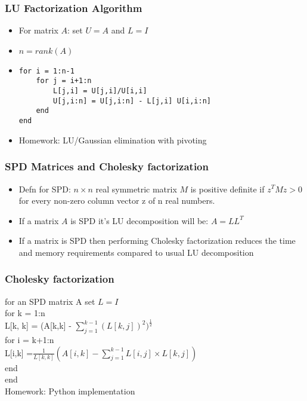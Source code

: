 \documentclass{beamer}
\begin{document}
\begin{frame}[fragile]
\frametitle{LU Factorization Algorithm}

\begin{itemize}
\item For matrix $A$: set $U = A$ and $L = I$
\item $n = rank(A)$
\item 
\begin{lstlisting}
for i = 1:n-1
	for j = i+1:n
  		L[j,i] = U[j,i]/U[i,i] 
  		U[j,i:n] = U[j,i:n] - L[j,i] U[i,i:n]
  	end
end
\end{lstlisting}
\item Homework: LU/Gaussian elimination with pivoting
\end{itemize}

\end{frame}

\begin{frame}
\frametitle{SPD Matrices and Cholesky factorization}

\begin{itemize}
\item Defn for SPD: $n \times n$ real symmetric matrix $M$ is positive definite if $z^TMz > 0$ for every non-zero column vector z of n real numbers.
\item If a matrix $A$ is SPD it's LU decomposition will be: $A = LL^T$
\item If a matrix is SPD then performing Cholesky factorization reduces the time and memory requirements compared to usual LU decomposition
\end{itemize}

\end{frame}


\begin{frame}
\frametitle{ Cholesky factorization}
for an SPD matrix A set $L = I$\\

for k = 1:n\\
\quad L[k, k] = (A[k,k] - $\sum_{j = 1}^{k-1}(L[k,j])^2)^{\frac{1}{2}}$ \\
\quad  for i = k+1:n\\
\quad \quad L[i,k] =$ \frac{1}{L[k,k]}(A[i,k] - \sum_{j=1}^{k-1}L[i,j]\times L[k,j])$\\
\quad  end\\
end \\

Homework: Python implementation 




\end{frame}
\end{document}
